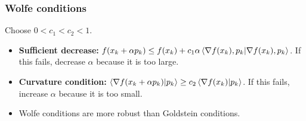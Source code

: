 \subsubsection*{Wolfe conditions}
Choose $0 < c_1 < c_2 < 1$.
\begin{itemize}
    \item \textbf{Sufficient decrease:} $f(x_k + \alpha p_k) \leq f(x_k) + c_1 \alpha \ip{\nabla f(x_k), p_k}$. If this fails, decrease $\alpha$ because it is too large.
    \item \textbf{Curvature condition:} $\ip{\nabla f(x_k + \alpha p_k)}{p_k} \geq c_2 \ip{\nabla f(x_k)}{p_k}$. If this fails, increase $\alpha$ because it is too small.
    \item Wolfe conditions are more robust than Goldstein conditions.
\end{itemize}


